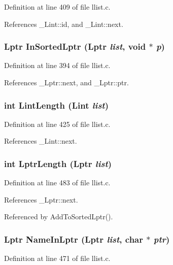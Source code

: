 Definition at line 409 of file llist.c.

References \_\-Lint::id, and \_\-Lint::next.
\subsubsection{\setlength{\rightskip}{0pt plus 5cm}\bf{Lptr} In\-Sorted\-Lptr (\bf{Lptr} {\em list}, void $\ast$ {\em p})}\label{llist_8c_74779b29bf8d2d4efeaca17cbc8b04bc}




Definition at line 394 of file llist.c.

References \_\-Lptr::next, and \_\-Lptr::ptr.
\subsubsection{\setlength{\rightskip}{0pt plus 5cm}int Lint\-Length (\bf{Lint} {\em list})}\label{llist_8c_a356168e5d726ab331b1399f46ff0ef2}




Definition at line 425 of file llist.c.

References \_\-Lint::next.
\subsubsection{\setlength{\rightskip}{0pt plus 5cm}int Lptr\-Length (\bf{Lptr} {\em list})}\label{llist_8c_b1d415009ec1742e8c506008ec65e66d}




Definition at line 483 of file llist.c.

References \_\-Lptr::next.

Referenced by Add\-To\-Sorted\-Lptr().
\subsubsection{\setlength{\rightskip}{0pt plus 5cm}\bf{Lptr} Name\-In\-Lptr (\bf{Lptr} {\em list}, char $\ast$ {\em ptr})}\label{llist_8c_b3a105ba6c7bd6f9e20f0eb82a21ba06}




Definition at line 471 of file llist.c.

